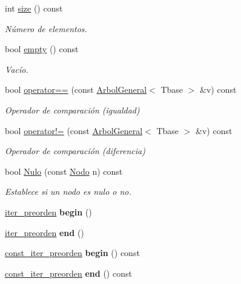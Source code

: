 \begin{DoxyCompactItemize}
int \hyperlink{class_arbol_general_a69a2c10bedbf77dbc23baea0a731a02d}{size} () const 
\begin{DoxyCompactList}\small\item\em Número de elementos. \end{DoxyCompactList}\item 
bool \hyperlink{class_arbol_general_ab7b59c8fe7e74f78f3533965460a6c9a}{empty} () const 
\begin{DoxyCompactList}\small\item\em Vacío. \end{DoxyCompactList}\item 
bool \hyperlink{class_arbol_general_a5c7db1c3f26d29b887ba906d02397a8d}{operator==} (const \hyperlink{class_arbol_general}{Arbol\+General}$<$ Tbase $>$ \&v) const 
\begin{DoxyCompactList}\small\item\em Operador de comparación (igualdad) \end{DoxyCompactList}\item 
bool \hyperlink{class_arbol_general_ab5b783cb068a394511f99e08a827cdda}{operator!=} (const \hyperlink{class_arbol_general}{Arbol\+General}$<$ Tbase $>$ \&v) const 
\begin{DoxyCompactList}\small\item\em Operador de comparación (diferencia) \end{DoxyCompactList}\item 
bool \hyperlink{class_arbol_general_aaacb4692182d8b80e3c66696c6f877bc}{Nulo} (const \hyperlink{class_arbol_general_a12cc1b74a9095d89bc7334290d332f7a}{Nodo} n) const 
\begin{DoxyCompactList}\small\item\em Establece si un nodo es nulo o no. \end{DoxyCompactList}\item 
\hyperlink{class_arbol_general_1_1iter__preorden}{iter\+\_\+preorden} {\bfseries begin} ()\hypertarget{class_arbol_general_afbaa00d73656de3957e6f0427ba53347}{}\label{class_arbol_general_afbaa00d73656de3957e6f0427ba53347}

\item 
\hyperlink{class_arbol_general_1_1iter__preorden}{iter\+\_\+preorden} {\bfseries end} ()\hypertarget{class_arbol_general_a7d6434353f5d55acf8c22226838da586}{}\label{class_arbol_general_a7d6434353f5d55acf8c22226838da586}

\item 
\hyperlink{class_arbol_general_1_1const__iter__preorden}{const\+\_\+iter\+\_\+preorden} {\bfseries begin} () const \hypertarget{class_arbol_general_a63912c2167da4335982ea59948404d4a}{}\label{class_arbol_general_a63912c2167da4335982ea59948404d4a}

\item 
\hyperlink{class_arbol_general_1_1const__iter__preorden}{const\+\_\+iter\+\_\+preorden} {\bfseries end} () const \hypertarget{class_arbol_general_a457b326a6347bb4d9b1cf6a062b32988}{}\label{class_arbol_general_a457b326a6347bb4d9b1cf6a062b32988}

\end{DoxyCompactItemize}
